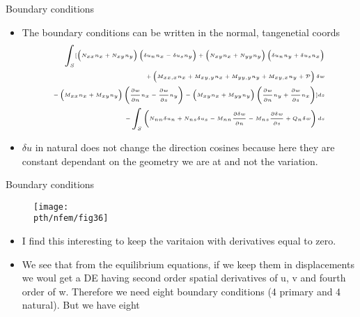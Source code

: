 	\begin{frame}{Boundary conditions}
		\begin{itemize}
			\item The boundary conditions can be written in the normal, tangenetial coords 
			\begin{equation}
			\tiny
			\begin{aligned}
			\int_S [ 
			\left(N_{xx}n_x + N_{xy}n_y\right)\left(\delta u_nn_x - \delta u_sn_y\right) +
			\left(N_{xy}n_x + N_{yy}n_y\right)\left(\delta u_nn_y + \delta u_sn_x\right) \\ +
			\left( M_{xx,x}n_x + M_{xy,y}n_x + M_{yy,y}n_y + M_{xy,x}n_y + \mathcal{P} \right) \delta w \\ - 
			\left(M_{xx}n_x + M_{xy}n_y \right)\left(\frac{\partial w}{\partial n} n_x 
			- \frac{\partial w}{\partial s}n_y \right) - 
			\left(M_{xy}n_x + M_{yy}n_y \right)\left(\frac{\partial w}{\partial n} n_y 
			+ \frac{\partial w}{\partial s}n_x \right)]ds\\
			 - \int_S \left(N_{nn} \delta u_n + N_{ns}\delta u_s - M_{nn}\frac{\partial \delta w}{\partial n} - M_{ns}\frac{\partial \delta w}{\partial s} + Q_n \delta w \right)ds
			\end{aligned} 
			\end{equation}
			\item $\delta u$ in natural does not change the direction cosines because here they are constant dependant on the geometry we are at and not the variation.
		\end{itemize}
	\end{frame}


	\begin{frame}{Boundary conditions}
		\begin{figure}
			\centering
			\texttt{[image: \\pth/nfem/fig36]} 		
		\end{figure}
		\begin{itemize}
			\tiny
			\item I find this interesting to keep the varitaion with derivatives equal to zero.
			\item We see that from the equilibrium equations, if we keep them in displacements we woul get a DE having second order spatial derivatives of u, v and fourth order of w. Therefore we need eight boundary conditions (4 primary and 4 natural). But we have eight
		\end{itemize}
	\end{frame}


